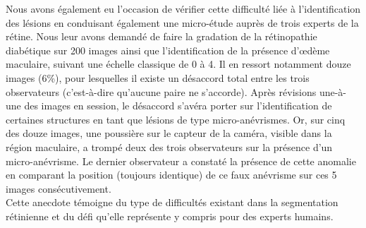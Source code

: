 Nous avons également eu l'occasion de vérifier cette difficulté liée à l'identification des lésions en conduisant également une micro-étude auprès de trois experts de la rétine. Nous leur avons demandé de faire la gradation de la rétinopathie diabétique sur 200 images ainsi que l'identification de la présence d'\oe dème maculaire, suivant une échelle classique de 0 à 4. Il en ressort notamment douze images (6\%), pour lesquelles il existe un désaccord total entre les trois observateurs (c'est-à-dire qu'aucune paire ne s'accorde). Après révisions une-à-une des images en session, le désaccord s'avéra porter sur l'identification de certaines structures en tant que lésions de type micro-anévrismes. Or, sur cinq des douze images, une poussière sur le capteur de la caméra, visible dans la région maculaire, a trompé deux des trois observateurs sur la présence d'un micro-anévrisme. Le dernier observateur a constaté la présence de cette anomalie en comparant la position (toujours identique) de ce faux anévrisme sur ces 5 images consécutivement.
\\ 
Cette anecdote témoigne du type de difficultés existant dans la segmentation rétinienne et du défi qu'elle représente y compris pour des experts humains.
